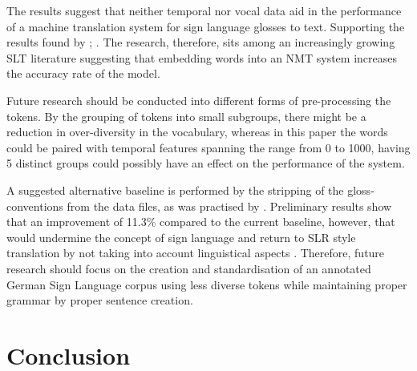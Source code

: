 The results suggest that neither temporal nor vocal data aid in the performance of a machine translation system for sign language glosses to text. Supporting the results found by \citealt{camgoz2018neural}; \citealt{qi2018and}. The research, therefore, sits among an increasingly growing SLT literature suggesting that embedding words into an NMT system increases the accuracy rate of the model.

Future research should be conducted into different forms of pre-processing the tokens. By the grouping of tokens into small subgroups, there might be a reduction in over-diversity in the vocabulary, whereas in this paper the words could be paired with temporal features spanning the range from 0 to 1000, having 5 distinct groups could possibly have an effect on the performance of the system.

A suggested alternative baseline is performed by the stripping of the gloss-conventions \cite{konradoffentliches} from the data files, as was practised by \citet{othman2012english}. Preliminary results show that an improvement of 11.3\% compared to the current baseline, however, that would undermine the concept of sign language and return to SLR style translation by not taking into account linguistical aspects \cite{camgoz2018neural}. Therefore, future research should focus on the creation and standardisation of an annotated German Sign Language corpus using less diverse tokens while maintaining proper grammar by proper sentence creation.


\section{Conclusion}

